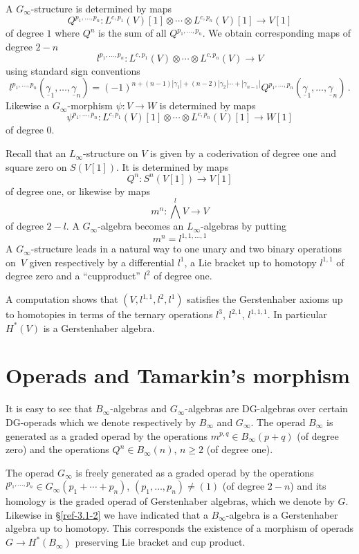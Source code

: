 \documentclass{amsart}
\numberwithin{equation}{section}
\theoremstyle{definition}
\theoremstyle{remark}
\begin{document}
A $G_\infty$-structure is determined by maps 
\[
Q^{p_1,\ldots,p_n}: L^{c,p_1}(V)[1]\otimes
\cdots\otimes L^{c,p_n}(V)[1]\rightarrow V[1]
\]
of degree $1$ where $Q^n$ is the sum of all $Q^{p_1,\ldots,p_n}$. We obtain corresponding 
maps of degree $2-n$ 
\[
l^{p_1,\ldots,p_n}:L^{c,p_1}(V)\otimes\cdots\otimes L^{c,p_n}(V)\rightarrow V
\]
using standard sign conventions 
\[
l^{p_1,\ldots,p_n}(\underline{\gamma}_1,\ldots,\underline{\gamma}_n)=
(-1)^{n+(n-1)|\gamma_1|+(n-2)|\gamma_2|\cdots+|\gamma_{n-1}|}
Q^{p_1,\ldots,p_n}(\underline{\gamma}_1,\ldots,\underline{\gamma}_n)\,.
\]
Likewise a $G_\infty$-morphism $\psi:V\rightarrow W$ is determined by maps 
\[
\psi^{p_1,\ldots,p_n}: L^{c,p_1}(V)[1]\otimes
\cdots\otimes L^{c,p_n}(V)[1]\rightarrow W[1]
\]
of degree $0$. 

Recall that an $L_\infty$-structure on $V$ is given by a coderivation
of degree one and square zero on $S(V[1])$. It is determined by maps
\[
Q^n:S^n(V[1])\rightarrow V[1]
\]
of degree one, or likewise by maps
\[
m^n:\bigwedge^l V\rightarrow V
\]
of degree $2-l$. 
A $G_\infty$-algebra becomes an $L_\infty$-algebras by putting
\[
m^n=l^{1,1,\ldots,1}
\]
A $G_\infty$-structure leads in a natural way to one unary and two
binary operations on~$V$ given respectively by a differential $l^1$, a
Lie bracket up to homotopy $l^{1,1}$ of degree
zero and a ``cupproduct'' $l^2$ of degree one.

A computation shows that $(V,l^{1,1},l^2,l^1)$ satisfies the
Gerstenhaber axioms up to homotopies in terms of the ternary operations
$l^{3}$, $l^{2,1}$, $l^{1,1,1}$.  In particular
$H^\ast(V)$ is a Gerstenhaber algebra.

\section{Operads and Tamarkin's morphism}
\label{ref-5-9}

It is easy to see that $B_\infty$-algebras and $G_\infty$-algebras are
DG-algebras over certain DG-operads which we denote respectively by
$B_\infty$ and $G_\infty$.  The operad $B_\infty$ is generated as a graded
operad by the
operations $m^{p,q}\in B_\infty(p+q)$ (of degree zero)
and the operations $Q^n\in B_\infty(n)$, $n\ge 2$ (of degree one).

The operad $G_\infty$ is freely generated as a graded operad by the
operations $l^{p_1,\ldots,p_n}\in G_\infty(p_1+\cdots+p_n)$,
$(p_1,\ldots,p_n)\neq (1)$ (of degree $2-n$) and its homology is the
graded operad of Gerstenhaber algebras, which we denote by $G$.
Likewise in \S\ref{ref-3.1-2} we have indicated that a $B_\infty$-algebra
is a Gerstenhaber algebra up to homotopy.  This corresponds the
existence of a morphism of operads $G\rightarrow H^\ast(B_\infty)$ preserving
Lie bracket and cup product.
\end{document}
